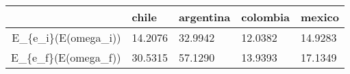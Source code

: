 \begin{table}[ht]
\centering
\begin{tabular}{rllll}
  \hline
 & chile & argentina & colombia & mexico \\ 
  \hline
E\_\{e\_i\}(E(omega\_i)) & 14.2076 & 32.9942 & 12.0382 & 14.9283 \\ 
  E\_\{e\_f\}(E(omega\_f)) & 30.5315 & 57.1290 & 13.9393 & 17.1349 \\ 
   \hline
\end{tabular}
\end{table}
